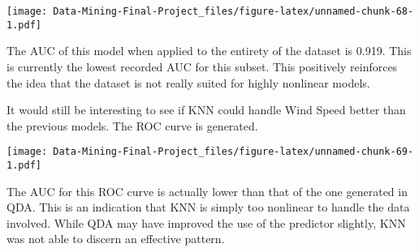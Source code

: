 \documentclass[
]{article}
\newenvironment{Shaded}{\begin{snugshade}}{\end{snugshade}}
\newcommand{\AttributeTok}[1]{\textcolor[rgb]{0.13,0.29,0.53}{#1}}
\newcommand{\CommentTok}[1]{\textcolor[rgb]{0.56,0.35,0.01}{\textit{#1}}}
\newcommand{\ConstantTok}[1]{\textcolor[rgb]{0.56,0.35,0.01}{#1}}
\newcommand{\DecValTok}[1]{\textcolor[rgb]{0.00,0.00,0.81}{#1}}
\newcommand{\FunctionTok}[1]{\textcolor[rgb]{0.13,0.29,0.53}{\textbf{#1}}}
\newcommand{\NormalTok}[1]{#1}
\newcommand{\OtherTok}[1]{\textcolor[rgb]{0.56,0.35,0.01}{#1}}
\newcommand{\SpecialCharTok}[1]{\textcolor[rgb]{0.81,0.36,0.00}{\textbf{#1}}}
\newcommand{\StringTok}[1]{\textcolor[rgb]{0.31,0.60,0.02}{#1}}
\begin{document}
\texttt{[image: Data-Mining-Final-Project\_files/figure-latex/unnamed-chunk-68-1.pdf]}

The AUC of this model when applied to the entirety of the dataset is
0.919. This is currently the lowest recorded AUC for this subset. This
positively reinforces the idea that the dataset is not really suited for
highly nonlinear models.

It would still be interesting to see if KNN could handle Wind Speed
better than the previous models. The ROC curve is generated.

\begin{Shaded}
\end{Shaded}

\texttt{[image: Data-Mining-Final-Project\_files/figure-latex/unnamed-chunk-69-1.pdf]}

The AUC for this ROC curve is actually lower than that of the one
generated in QDA. This is an indication that KNN is simply too nonlinear
to handle the data involved. While QDA may have improved the use of the
predictor slightly, KNN was not able to discern an effective pattern.
\end{document}
